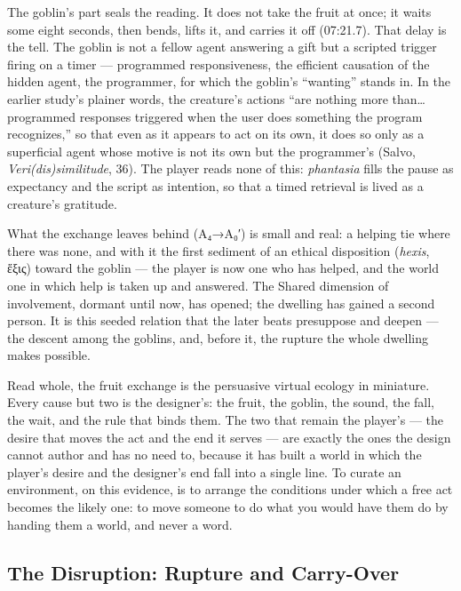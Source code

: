 \documentclass{article}
\newcommand{\gk}[1]{{\greekfont #1}}
\begin{document}
The goblin's part seals the reading. It does not take the fruit at once; it waits some eight seconds, then bends, lifts it, and carries it off (07:21.7). That delay is the tell. The goblin is not a fellow agent answering a gift but a scripted trigger firing on a timer — programmed responsiveness, the efficient causation of the hidden agent, the programmer, for which the goblin's ``wanting'' stands in. In the earlier study's plainer words, the creature's actions ``are nothing more than… programmed responses triggered when the user does something the program recognizes,'' so that even as it appears to act on its own, it does so only as a superficial agent whose motive is not its own but the programmer's (Salvo, \textit{Veri(dis)similitude}, 36). The player reads none of this: \textit{phantasia} fills the pause as expectancy and the script as intention, so that a timed retrieval is lived as a creature's gratitude.

What the exchange leaves behind (A₄→A₀′) is small and real: a helping tie where there was none, and with it the first sediment of an ethical disposition (\textit{hexis}, \gk{ἕξις}) toward the goblin — the player is now one who has helped, and the world one in which help is taken up and answered. The Shared dimension of involvement, dormant until now, has opened; the dwelling has gained a second person. It is this seeded relation that the later beats presuppose and deepen — the descent among the goblins, and, before it, the rupture the whole dwelling makes possible.

Read whole, the fruit exchange is the persuasive virtual ecology in miniature. Every cause but two is the designer's: the fruit, the goblin, the sound, the fall, the wait, and the rule that binds them. The two that remain the player's — the desire that moves the act and the end it serves — are exactly the ones the design cannot author and has no need to, because it has built a world in which the player's desire and the designer's end fall into a single line. To curate an environment, on this evidence, is to arrange the conditions under which a free act becomes the likely one: to move someone to do what you would have them do by handing them a world, and never a word.

\bigskip

\subsection*{The Disruption: Rupture and Carry-Over}
\end{document}
